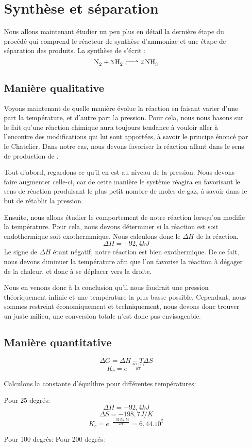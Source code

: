 \documentclass[10pt,a4paper]{article}
\begin{document}
\section{Synthèse  et séparation}

Nous allons maintenant étudier un peu plus en détail la dernière étape du procédé qui comprend le réacteur de synthèse d’ammoniac et une étape de séparation des produits.
La synthèse de  s'écrit :
$$ \ce{N2 + 3H2 <=> 2NH3}$$

\subsection{Manière qualitative}
Voyons maintenant de quelle manière évolue la réaction en faisant varier d'une part la température, et d'autre part la pression. Pour cela, nous nous basons sur le fait qu'une réaction chimique aura toujours tendance à vouloir aller à l'encontre des modifications qui lui sont apportées, à savoir le principe énoncé par le Chatelier. Dans notre cas, nous devons favoriser la réaction allant dans le sens de production de .

Tout d'abord, regardons ce qu'il en est au niveau de la pression. Nous devons faire augmenter celle-ci, car de cette manière le système réagira en favorisant le sens de réaction produisant le plus petit nombre de moles de gaz, à savoir  dans le but de rétablir la pression. 

Ensuite, nous allons étudier le comportement de notre réaction lorsqu'on modifie la température. Pour cela, nous devons déterminer si la réaction est soit endothermique soit exothermmique. Nous calculons donc le $\Delta H$  de la réaction. $$\Delta H = \unit{-92,4}{kJ}$$
Le signe de $\Delta H$ étant négatif, notre réaction est bien exothermique. De ce fait, nous devons diminuer la température afin que l'on favorise la réaction à dégager de la chaleur, et donc à se déplacer vers la droite.

Nous en venons donc à la conclusion qu'il nous faudrait une pression théoriquement infinie et une température la plus basse possible. Cependant, nous sommes restreint économiquement et techniquement, nous devons donc trouver un juste milieu, une conversion totale n'est donc pas envisageable. 

\subsection{Manière quantitative}

$$\Delta G = \Delta H - T \Delta S $$
$$ K_{c} = e^{-\frac{\Delta G(T)}{RT}}$$


Calculons la constante d'équilibre pour différentes températures: 

Pour 25 degrés:
$$ \Delta H = \unit{-92,4}{kJ} $$ 
$$ \Delta S = \unit{-198,7}{J/K} $$  
$$ K_{c} = e^{-\frac{-33157,59}{RT}} = 6,44.10^{5}$$

Pour 100 degrés:
Pour 200 degrés:


\end{document}
